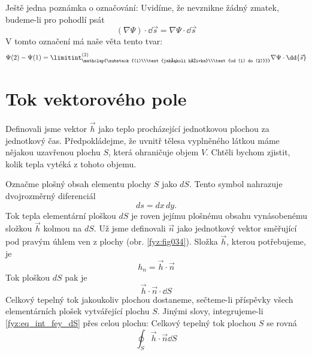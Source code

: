     Ještě jedna poznámka o označování: Uvidíme, že nevznikne žádný zmatek, budeme-li pro pohodlí psát
    \begin{equation}\label{fyz:eq269}
     (\nabla\Psi)\cdot\dd{\vec{s}} = \nabla\Psi\cdot\dd{\vec{s}}
    \end{equation}     
    V tomto označení má naše věta tento tvar:
    \begin{equation}\label{fyz:eq273}
     \Psi(2)-\Psi(1) =  
       \limitint_{\mathclap{\substack{(1)\\\text{jakákoli křivka}\\\text{od (1) do 
       (2)}}}}^{(2)}
         \nabla\Psi\cdot\dd{\vec{s}}
    \end{equation}

  \section{Tok vektorového pole}\label{fyz:IIchapIIIsecII}
    Definovali jsme vektor $\vec{h}$ jako teplo procházející jednotkovou plochou za jednotkový čas.
    Předpokládejme, že uvnitř tělesa vyplněného látkou máme nějakou uzavřenou plochu \(S\), která 
    ohraničuje objem \(V\). Chtěli bychom zjistit, kolik tepla vytéká z tohoto objemu.
    
    Označme plošný obsah elementu plochy \(S\) jako \(dS\). Tento symbol nahrazuje dvojrozměrný
    diferenciál
    \begin{equation}
      ds=dx\,dy.
    \end{equation}
    Tok tepla elementární ploškou \(dS\) je roven jejímu plošnému obsahu  vynásobenému složkou 
    $\vec{h}$ kolmou na \(dS\). Už jsme definovali $\vec{n}$ jako jednotkový vektor směřující pod 
    pravým úhlem ven z plochy (obr. \ref{fyz:fig034}). Složka $\vec{h}$, kterou potřebujeme, je
    \begin{equation}
      h_n = \vec{h}\cdot\vec{n}
    \end{equation}
    Tok ploškou $dS$ pak je
    \begin{equation}\label{fyz:eq_int_fey_dS}
      \vec{h}\cdot\vec{n}\cdot\dd{S}
    \end{equation}
    Celkový tepelný tok jakoukoliv plochou dostaneme, sečteme-li příspěvky všech elementárních 
    plošek vytvářející plochu \(S\). Jinými slovy, integrujeme-li \ref{fyz:eq_int_fey_dS} přes 
    celou plochu: Celkový tepelný tok plochou \(S\) se rovná
    \begin{equation}
      \oint_S\vec{h}\cdot\vec{n}\dd{S}
    \end{equation}

